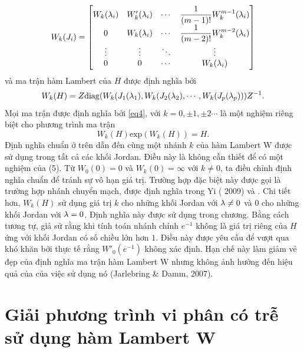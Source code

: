 \begin{equation}\label{eq3}
	W_k(J_i)= \begin{bmatrix}
		W_k(\lambda_i)  & W'_k(\lambda_i) & \cdots & \dfrac{1}{(m-1)!} W_k ^{m-1}(\lambda_i)\\
		0 & W_k(\lambda_i) & \cdots & \dfrac{1}{(m-2)!} W_k ^{m-2}(\lambda_i)\\
		\vdots  & \vdots  & \ddots & \vdots  \\
		0 & 0 & \cdots & W_k(\lambda_i)
	\end{bmatrix} 
\end{equation}
và ma trận hàm Lambert của $H$ được định nghĩa bởi
\begin{equation}\label{eq4}
	W_k(H)= Z \mathrm{diag} (W_k(J_1(\lambda_1),W_k(J_2(\lambda_2), \cdots , W_k(J_p(\lambda_p) ))Z^{-1}.
\end{equation}
Mọi ma trận được định nghĩa bởi \eqref{eq4}, với $k = 0, \pm 1, \pm 2 \cdots$ là một nghiệm riêng biệt cho phương trình ma trận 
\begin{equation}\label{eq5}
	W_k(H) \mathrm{exp}	(W_k(H)) = H.
\end{equation}		
Định nghĩa chuẩn ở trên dẫn đến cùng một nhánh $k$ của hàm Lambert W được sử dụng trong tất cả các khối Jordan. Điều này là không cần thiết để có một nghiệm của (5). Từ $W_0(0)= 0$ và $W_k(0) = \infty$ với $k \ne 0$, ta điều chỉnh định nghĩa chuẩn để tránh sự vô hạn giá trị. Trường hợp đặc biệt này được gọi là trường hợp nhánh chuyển mạch, được định nghĩa trong  Yi ( 2009) và \cite{Yi10} . Chi tiết hơn, $W_k(H)$ sử dụng giá trị $k$ cho những khối Jordan với $\lambda \ne 0$ và $0$ cho những khối Jordan với $\lambda = 0$. Định nghĩa này được sử dụng trong chương.
Bằng cách tương tự, giả sử rằng khi tính toán nhánh chính $e ^{-1}$ không là giá trị riêng của $H$ ứng với khối Jordan có số chiều lớn hơn $1$. Điều này được yêu cầu để vượt qua khó khăn bởi thực tế rằng $W'_0(e ^{-1})$ không xác định. Hạn chế này làm giảm vẻ đẹp của định nghĩa ma trận hàm Lambert W nhưng không ảnh hưởng đến hiệu quả của của việc sử dụng nó (Jarlebring \& Damm, 2007).



\section{Giải phương trình vi phân có trễ sử dụng hàm Lambert W}
